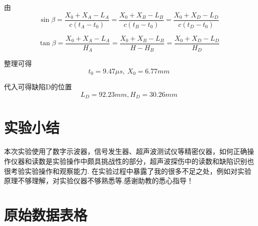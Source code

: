 \documentclass{thureport}
\begin{document}
由
$$\sin\beta=\frac{X_0+X_A-L_A}{c(t_A-t_0)}=\frac{X_0+X_B-L_B}{c(t_B-t_0)}=\frac{X_0+X_D-L_D}{c(t_D-t_0)}$$

$$\tan\beta=\frac{X_0+X_A-L_A}{H_A}=\frac{X_0+X_B-L_B}{H-H_B}=\frac{X_0+X_D-L_D}{H_D}$$

整理可得
$$t_0=9.47\mu s,\ X_0=6.77mm$$

代入可得缺陷D的位置
$$L_D=92.23mm,H_D=30.26mm$$

\section{实验小结}
本次实验使用了数字示波器，信号发生器、超声波测试仪等精密仪器，如何正确操作仪器和读数是实验操作中颇具挑战性的部分，超声波探伤中的读数和缺陷识别也很考验实验操作和观察能力. 在实验过程中暴露了我的很多不足之处，例如对实验原理不够理解，对实验仪器不够熟悉等.感谢助教的悉心指导！

\newpage
\section{原始数据表格}
\end{document}
